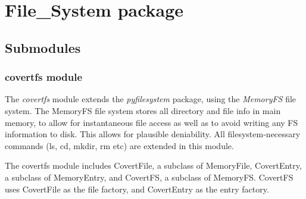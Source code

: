 \documentclass[letterpaper,12pt,openany,oneside]{sphinxmanual}
\begin{document}

\begin{fulllineitems}
\label{console:covertFS.console.main}
\end{fulllineitems}


\begin{fulllineitems}
\label{console:covertFS.console.proxy_parser}
\end{fulllineitems}


\begin{fulllineitems}
\label{console:covertFS.console.proxy_test}
\end{fulllineitems}



\section{File\_System package}
\label{File_System::doc}\label{File_System:file-system-package}

\subsection{Submodules}
\label{File_System:submodules}

\subsubsection{covertfs module}
\label{File_System:module-covertFS.File_System.covertfs}\label{File_System:covertfs-module}
The \emph{covertfs} module extends the \emph{pyfilesystem} package, using the \emph{MemoryFS}
file system.
The MemoryFS file system stores all directory and file info in main memory,
to allow for instantaneous file access as well as to avoid writing any FS
information to disk. This allows for plausible deniability. All
filesystem-necessary commands (ls, cd, mkdir, rm etc) are extended in this
module.

The covertfs module includes CovertFile, a subclass of MemoryFile, CovertEntry,
a subclass of MemoryEntry, and CovertFS, a subclass of MemoryFS. CovertFS uses
CovertFile as the file factory, and CovertEntry as the entry factory.
\end{document}
